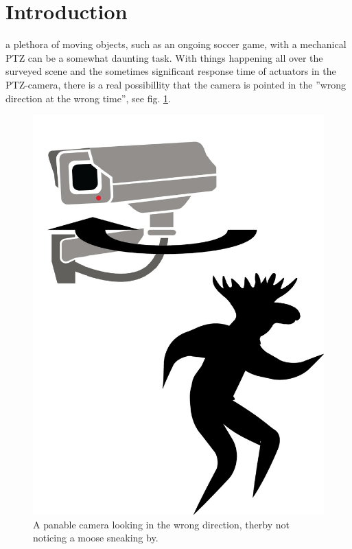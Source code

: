 \section{Introduction}


 a plethora of moving objects, such as an ongoing soccer game, with a mechanical PTZ can be a somewhat daunting task. With things happening all over the surveyed scene and the sometimes significant response time of actuators in the PTZ-camera, there is a real possibillity that the camera is pointed in the ''wrong direction at the wrong time'', see fig. \ref{fig:problem}.

\begin{figure}[H]
	\centering
	\includegraphics[width=0.5 \columnwidth]{../results/images/PTZ_problem.jpg}
	\caption{A panable camera looking in the wrong direction, therby not noticing a moose sneaking by.}
	\label{fig:problem}
\end{figure}

